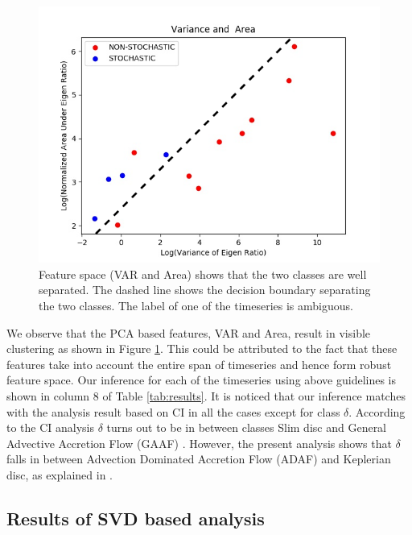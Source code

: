 \documentclass[10pt,conference]{IEEEtran}
\begin{document}
\begin{figure}
    \centering
    \includegraphics[width=.9\linewidth]{var_area_fs.drawio.png}
    \caption{Feature space (VAR and Area) shows that the two classes are well separated. The dashed line shows the decision boundary separating the two classes. The label of one of the timeseries is ambiguous.}
    \label{fig:variance_area_fs}
\end{figure}

We observe that the PCA based features, VAR and Area, result in visible clustering as shown in Figure \ref{fig:variance_area_fs}. This could be attributed to the fact that   these features take into account the entire span of timeseries and hence form robust feature space. Our inference for each of the timeseries using above guidelines is shown in column 8 of Table \ref{tab:results}. It is noticed that our inference matches with the analysis result based on CI in all the cases except for class $\delta$. According to the CI analysis $\delta$ turns out to be in between classes Slim disc and General Advective Accretion Flow (GAAF) \cite{Adegoke2018}. However, the present analysis shows that $\delta$ falls in between Advection Dominated Accretion Flow (ADAF) and Keplerian disc, as explained in \cite{Adegoke2018}.


\subsection{Results of SVD based analysis}
\end{document}
